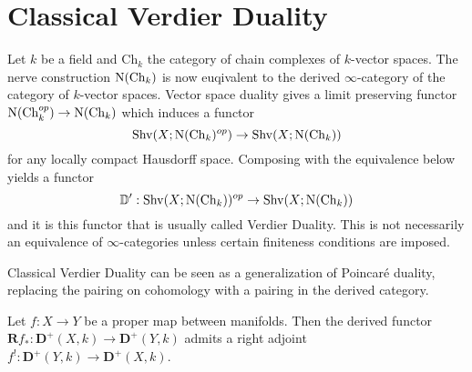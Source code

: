 \documentclass[../../thesis.tex]{subfiles}
\begin{document}
\section{Classical Verdier Duality}
Let $k$ be a field and $\mathrm{Ch}_k$ the category of chain complexes of $k$-vector spaces.
The nerve construction $\mathrm{N}(\mathrm{Ch}_k)$ is now euqivalent to the derived $\infty$-category of the category of $k$-vector spaces.
Vector space duality gives a limit preserving functor $\mathrm{N}(\mathrm{Ch}_k^{op}) \to \mathrm{N}(\mathrm{Ch}_k)$ which induces a functor
\[
    \mathrm{Shv}(X;\mathrm{N}(\mathrm{Ch}_k)^{op}) \to \mathrm{Shv}(X;\mathrm{N}(\mathrm{Ch}_k))
\]
for any locally compact Hausdorff space.
Composing with the equivalence below yields a functor
\[
    \mathbb{D}': \mathrm{Shv}(X;\mathrm{N}(\mathrm{Ch}_k))^{op} \to \mathrm{Shv}(X;\mathrm{N}(\mathrm{Ch}_k))
\]
and it is this functor that is usually called Verdier Duality. This is not necessarily an equivalence of $\infty$-categories unless certain finiteness conditions are imposed.


Classical Verdier Duality can be seen as a generalization of Poincaré duality, replacing the pairing on cohomology with a pairing in the derived category.
\begin{theorem}
    Let $f : X \to Y$ be a proper map between manifolds.
    Then the derived functor $\mathbf{R}f_* : \mathbf{D}^+(X,k) \to \mathbf{D}^+(Y,k)$ admits a right adjoint $f^!:\mathbf{D}^+(Y,k) \to \mathbf{D}^+(X,k)$.
\end{theorem}
\end{document}
